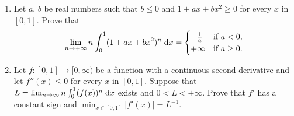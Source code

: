 \documentclass{article}
\begin{document}
	\setlength{\parindent}{0pt}
	\begin{enumerate}[label=\alph*)]
		\item Let $a$, $b$ be real numbers such that $b\leq0$ and $1+ax+bx^2\geq0$ for every $x$ in $[0,1]$. Prove that
		$$\lim_{n\to+\infty} n\int_{0}^{1}(1+ax+bx^2)^n\;\textup{d} x=\begin{cases}
			-\frac{1}{a}&\textup{if }a<0,\\
			+\infty&\textup{if }a\geq 0.
		\end{cases}$$
		\item Let $f:[0,1]\to[0,\infty)$ be a function with a continuous second derivative and let $f''(x)\leq0$ for every $x$ in $[0,1]$. Suppose that $L=\lim_{n\to\infty} n\int_{0}^{1}(f(x))^n\;\textup{d}x$ exists and $0<L<+\infty$. Prove that $f'$ has a constant sign and $\min_{x\in[0,1]}\lvert f'(x)\rvert=L^{-1}$.
	\end{enumerate}
\end{document}
